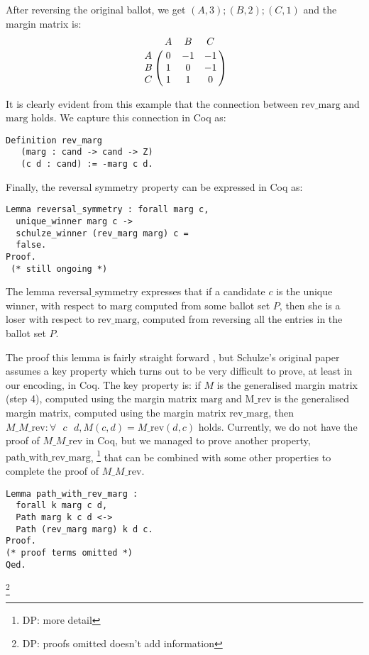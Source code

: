 \documentclass[compsoc,conference,a4paper,10pt,times]{IEEEtran}
\begin{document}
\noindent      
After reversing the original ballot, we get $(A, 3); (B, 2); (C, 1)$ and 
the margin matrix is:
\[
\bordermatrix{ & A & B & C \cr
      A & 0 & -1 & -1 \cr
      B & 1 & 0 & -1 \cr
      C & 1 & 1 & 0 }
      \]


\noindent
It is clearly evident from this example that the 
connection between $\mathrm{rev\_marg}$ and $\mathrm{marg}$  holds.
We capture this connection in Coq as:

\begin{verbatim}
Definition rev_marg 
   (marg : cand -> cand -> Z) 
   (c d : cand) := -marg c d.
\end{verbatim}

\noindent


Finally, the reversal symmetry property can be expressed in Coq as: 
\begin{verbatim}
Lemma reversal_symmetry : forall marg c, 
  unique_winner marg c ->
  schulze_winner (rev_marg marg) c = 
  false.
Proof. 
 (* still ongoing *)
\end{verbatim}

\noindent
The lemma $\mathrm{reversal\_symmetry}$ expresses that if a candidate $c$ is the unique 
winner, with respect to $\mathrm{marg}$ computed from some ballot set $P$, then she is 
a loser with respect to $\mathrm{rev\_marg}$, computed from reversing all the entries 
in the ballot set $P$.

\noindent
The proof this lemma is fairly straight forward \cite{Schulze:2011:NMC}, but 
Schulze's original paper assumes a key property which turns out to be very difficult to prove, 
at least in our encoding, in Coq. The key property is: if $M$ 
is the generalised margin 
matrix (step 4), computed using the margin matrix $\mathrm{marg}$
and $\mathrm{M\_rev}$ is the generalised 
margin matrix, computed using the margin matrix $\mathrm{rev\_marg}$, then 
$M\_M\_\mathrm{rev}: \forall \text{ } c \text{ } d,  M(c, d) =
M\_\mathrm{rev} (d, c)$ holds. Currently, 
we do not have the proof of $M\_M\_\mathrm{rev}$ in Coq, but we managed to prove 
another property, $\mathrm{path\_with\_rev\_marg}$, 
\footnote{DP: more detail}
that can be combined with 
some other properties to complete the proof of $M\_M\_\mathrm{rev}$. 

\begin{verbatim}
Lemma path_with_rev_marg :
  forall k marg c d,
  Path marg k c d <->  
  Path (rev_marg marg) k d c.
Proof.
(* proof terms omitted *)  
Qed.
\end{verbatim}
\footnote{DP: proofs omitted doesn't add information}
\end{document}
